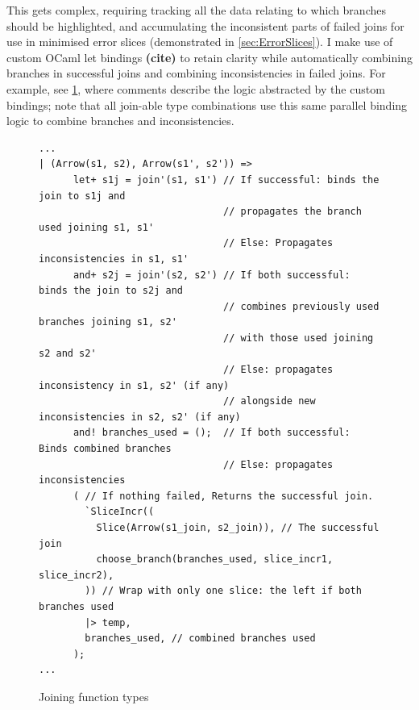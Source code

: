 This gets complex, requiring tracking all the data relating to which branches should be highlighted, and accumulating the inconsistent parts of failed joins for use in minimised error slices (demonstrated in \cref{sec:ErrorSlices}). I make use of custom OCaml let bindings \textbf{(cite)} to retain clarity while automatically combining branches in successful joins and combining inconsistencies in failed joins. For example, see \cref{fig:ArrowJoin}, where comments describe the logic abstracted by the custom bindings; note that all join-able type combinations use this same parallel binding logic to combine branches and inconsistencies.

\begin{figure}[h]
\small
\begin{verbatim}
...
| (Arrow(s1, s2), Arrow(s1', s2')) =>
      let+ s1j = join'(s1, s1') // If successful: binds the join to s1j and
                                // propagates the branch used joining s1, s1'
                                // Else: Propagates inconsistencies in s1, s1'
      and+ s2j = join'(s2, s2') // If both successful: binds the join to s2j and
                                // combines previously used branches joining s1, s2' 
                                // with those used joining s2 and s2'
                                // Else: propagates inconsistency in s1, s2' (if any)
                                // alongside new inconsistencies in s2, s2' (if any)
      and! branches_used = ();  // If both successful: Binds combined branches
                                // Else: propagates inconsistencies
      ( // If nothing failed, Returns the successful join.
        `SliceIncr((
          Slice(Arrow(s1_join, s2_join)), // The successful join
          choose_branch(branches_used, slice_incr1, slice_incr2),
        )) // Wrap with only one slice: the left if both branches used
        |> temp,
        branches_used, // combined branches used
      );
...
\end{verbatim}
\caption{Joining function types}
\label{fig:ArrowJoin}
\end{figure}

